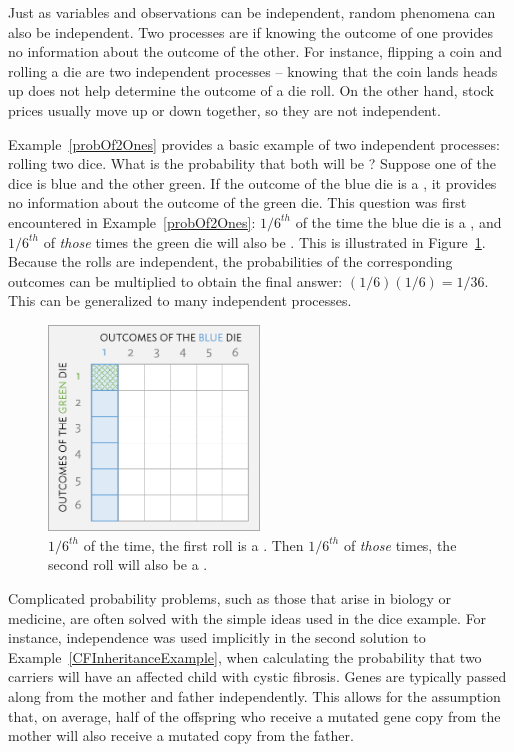 Just as variables and observations can be independent, random phenomena can also be independent. Two processes are  if knowing the outcome of one provides no information about the outcome of the other. For instance, flipping a coin and rolling a die are two independent processes -- knowing that the coin lands heads up does not help determine the outcome of a die roll. On the other hand, stock prices usually move up or down together, so they are not independent. 

Example~\ref{probOf2Ones} provides a basic example of two independent processes: rolling two dice. What is the probability that both will be ? Suppose one of the dice is blue and the other green. If the outcome of the blue die is a , it provides no information about the outcome of the green die. This question was first encountered in Example~\ref{probOf2Ones}: $1/6^{th}$ of the time the blue die is a , and $1/6^{th}$ of \emph{those} times the green die will also be . This is illustrated in Figure~\ref{fig:indepForRollingTwo1s}. Because the rolls are independent, the probabilities of the corresponding outcomes can be multiplied to obtain the final answer: $(1/6)(1/6)=1/36$. This can be generalized to many independent processes. 

\begin{figure}[hht]
\centering
\includegraphics[width=0.5\textwidth]{ch_probability_oi_biostat/figures/indepForRollingTwo1s/indepForRollingTwo1s.png}
\caption{$1/6^{th}$ of the time, the first roll is a . Then $1/6^{th}$ of \emph{those} times, the second roll will also be a .}
\label{fig:indepForRollingTwo1s}
\end{figure}

Complicated probability problems, such as those that arise in biology or medicine, are often solved with the simple ideas used in the dice example. For instance, independence was used implicitly in the second solution to Example~\ref{CFInheritanceExample}, when calculating the probability that two carriers will have an affected child with cystic fibrosis. Genes are typically passed along from the mother and father independently. This allows for the assumption that, on average, half of the offspring who receive a mutated gene copy from the mother will also receive a mutated copy from the father.


